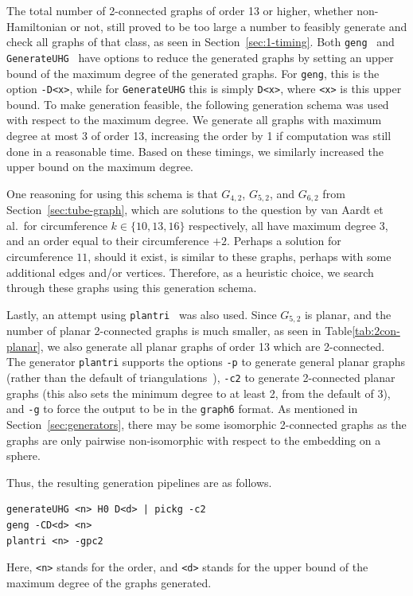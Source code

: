 The total number of 2-connected graphs of order 13 or higher, whether non-Hamiltonian or not, still proved to be too large a number to feasibly generate and check all graphs of that class, as seen in Section~\ref{sec:1-timing}. Both \texttt{geng}~\cite{lib:nauty} and \texttt{GenerateUHG}~\cite{lib:UHG} have options to reduce the generated graphs by setting an upper bound of the maximum degree of the generated graphs. For \texttt{geng}, this is the option \texttt{-D<x>}, while for \texttt{GenerateUHG} this is simply \texttt{D<x>}, where \texttt{<x>} is this upper bound. To make generation feasible, the following generation schema was used with respect to the maximum degree. We generate all graphs with maximum degree at most 3 of order 13, increasing the order by 1 if computation was still done in a reasonable time. Based on these timings, we similarly increased the upper bound on the maximum degree.

One reasoning for using this schema is that $G_{4,2}$, $G_{5,2}$, and $G_{6,2}$ from Section~\ref{sec:tube-graph}, which are solutions to the question by van Aardt et al.\ for circumference $k \in \{10, 13, 16\}$ respectively, all have maximum degree 3, and an order equal to their circumference $+ 2$. Perhaps a solution for circumference $11$, should it exist, is similar to these graphs, perhaps with some additional edges and/or vertices. Therefore, as a heuristic choice, we search through these graphs using this generation schema.

Lastly, an attempt using \texttt{plantri}~\cite{lib:plantri} was also used. Since $G_{5,2}$ is planar, and the number of planar 2-connected graphs is much smaller, as seen in Table\ref{tab:2con-planar}, we also generate all planar graphs of order 13 which are 2-connected. The generator \texttt{plantri} supports the options \texttt{-p} to generate general planar graphs (rather than the default of triangulations~\cite{lib:plantri}), \texttt{-c2} to generate 2-connected planar graphs (this also sets the minimum degree to at least 2, from the default of 3), and \texttt{-g} to force the output to be in the \texttt{graph6} format. As mentioned in Section~\ref{sec:generators}, there may be some isomorphic 2-connected graphs as the graphs are only pairwise non-isomorphic with respect to the embedding on a sphere.

Thus, the resulting generation pipelines are as follows.
\begin{verbatim}
generateUHG <n> H0 D<d> | pickg -c2
geng -CD<d> <n>
plantri <n> -gpc2
\end{verbatim}
Here, \texttt{<n>} stands for the order, and \texttt{<d>} stands for the upper bound of the maximum degree of the graphs generated.

